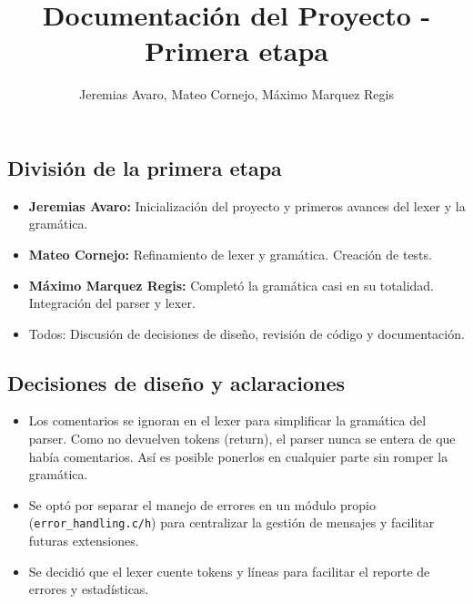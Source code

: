 \documentclass[12pt,a4paper]{article}
\title{Documentación del Proyecto - Primera etapa}
\author{Jeremias Avaro, Mateo Cornejo, Máximo Marquez Regis}
\date{}
\begin{document}
\maketitle

\subsection*{División de la primera etapa}
\begin{itemize}
    \item \textbf{Jeremias Avaro:} Inicialización del proyecto y primeros avances del lexer y la gramática.
    \item \textbf{Mateo Cornejo:} Refinamiento de lexer y gramática. Creación de tests.
    \item \textbf{Máximo Marquez Regis:} Completó la gramática casi en su totalidad. Integración del parser y lexer.
    \item Todos: Discusión de decisiones de diseño, revisión de código y documentación.
\end{itemize}

\subsection*{Decisiones de diseño y aclaraciones}
\begin{itemize}
    \item Los comentarios se ignoran en el lexer para simplificar la gramática del parser. Como no devuelven tokens (return), el parser nunca se entera de que había comentarios. Así es posible ponerlos en cualquier parte sin romper la gramática.
    \item Se optó por separar el manejo de errores en un módulo propio (\texttt{error\_handling.c/h}) para centralizar la gestión de mensajes y facilitar futuras extensiones.
    \item Se decidió que el lexer cuente tokens y líneas para facilitar el reporte de errores y estadísticas.
\end{itemize}
\end{document}
